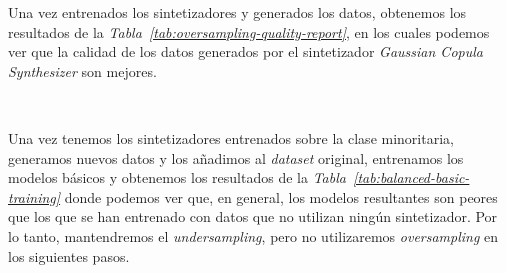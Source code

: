 Una vez entrenados los sintetizadores y generados los datos, obtenemos los resultados de la \textit{Tabla\ \ref{tab:oversampling-quality-report}}, en los cuales podemos ver que la calidad de los datos generados por el sintetizador \textit{Gaussian Copula Synthesizer} son mejores.

\begin{table}[!ht]
    \centering
    \caption{Resultados del \textit{quality report} de los datos generados con los sintetizadores. Fuente propia}\ \label{tab:oversampling-quality-report}
\end{table}

Una vez tenemos los sintetizadores entrenados sobre la clase minoritaria, generamos nuevos datos y los añadimos al \textit{dataset} original, entrenamos los modelos básicos y obtenemos los resultados de la \textit{Tabla\ \ref{tab:balanced-basic-training}} donde podemos ver que, en general, los modelos resultantes son peores que los que se han entrenado con datos que no utilizan ningún sintetizador. Por lo tanto, mantendremos el \textit{undersampling}, pero no utilizaremos \textit{oversampling} en los siguientes pasos.

